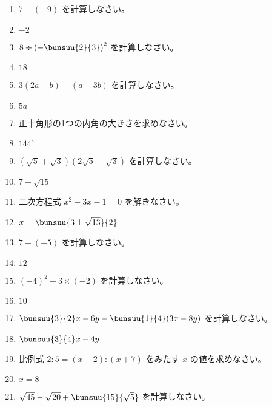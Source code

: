\documentclass[uplatex,a4j,11pt]{jsreport}
\begin{document}
\begin{multicols}{2}
\begin{enumerate}
    \item $7+(-9)$ を計算しなさい。%
    \item $-2$
    \item $8\div\left(-\bunsuu{2}{3}\right)^2$ を計算しなさい。%
    \item $18$
    \item $3(2a-b)-(a-3b)$ を計算しなさい。%
    \item $5a$
    \item 正十角形の1つの内角の大きさを求めなさい。%
    \item $144^\circ$
    \item $(\sqrt{5}+\sqrt{3})(2\sqrt{5}-\sqrt{3})$ を計算しなさい。%
    \item $7+\sqrt{15}$
    \item 二次方程式 $x^2-3x-1=0$ を解きなさい。%
    \item $x=\bunsuu{3\pm\sqrt{13}}{2}$
    \item $7-(-5)$ を計算しなさい。%
    \item $12$
    \item $(-4)^2+3\times(-2)$ を計算しなさい。%
    \item $10$
    \item $\bunsuu{3}{2}x-6y-\bunsuu{1}{4}(3x-8y)$ を計算しなさい。%
    \item $\bunsuu{3}{4}x-4y$
    \item 比例式 $2:5=(x-2):(x+7)$ をみたす $x$ の値を求めなさい。%
    \item $x=8$
    \item $\sqrt{45}-\sqrt{20}+\bunsuu{15}{\sqrt{5}}$ を計算しなさい。%

\end{enumerate}
\end{multicols}
\end{document}
